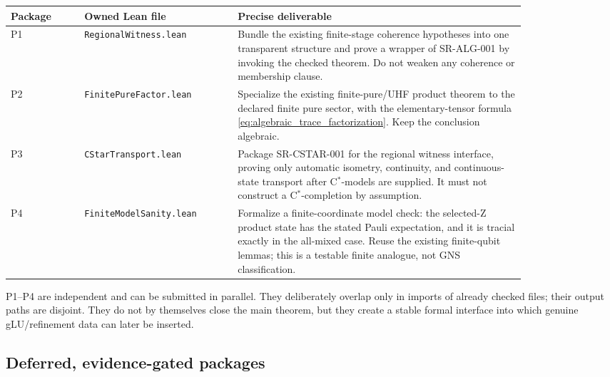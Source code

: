 \documentclass{article}
\begin{document}
\begin{center}
\small
\begin{tabular}{p{0.12\linewidth}p{0.25\linewidth}p{0.47\linewidth}}
\toprule
Package & Owned Lean file & Precise deliverable \\
\midrule
P1 & \texttt{RegionalWitness.lean} & Bundle the existing
finite-stage coherence hypotheses into one transparent structure and prove a
wrapper of SR-ALG-001 by invoking the checked theorem.  Do not weaken any
coherence or membership clause. \\
P2 & \texttt{FinitePureFactor.lean} & Specialize the
existing finite-pure/UHF product theorem to the declared finite pure sector,
with the elementary-tensor formula \eqref{eq:algebraic_trace_factorization}.
Keep the conclusion algebraic. \\
P3 & \texttt{CStarTransport.lean} & Package SR-CSTAR-001
for the regional witness interface, proving only automatic isometry,
continuity, and continuous-state transport after C\(^*\)-models are supplied.
It must not construct a C\(^*\)-completion by assumption. \\
P4 & \texttt{FiniteModelSanity.lean} & Formalize a
finite-coordinate model check: the selected-Z product state has the stated
Pauli expectation, and it is tracial exactly in the all-mixed case.  Reuse the
existing finite-qubit lemmas; this is a testable finite analogue, not GNS
classification. \\
\bottomrule
\end{tabular}
\end{center}

P1--P4 are independent and can be submitted in parallel.  They deliberately
overlap only in imports of already checked files; their output paths are
disjoint.  They do not by themselves close the main theorem, but they create a
stable formal interface into which genuine gLU/refinement data can later be
inserted.

\subsection*{Deferred, evidence-gated packages}
\end{document}
